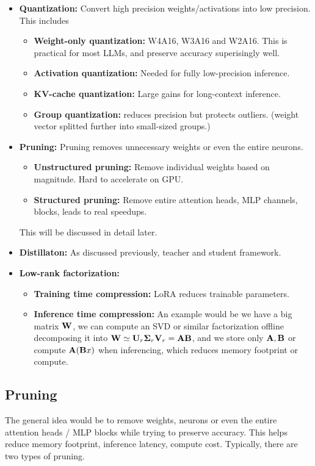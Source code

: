 \documentclass[11pt]{article}  %
\begin{document}
\begin{itemize}
  \item \textbf{Quantization:} Convert high precision weights/activations into low precision. This includes 
  \begin{itemize}
    \item \textbf{Weight-only quantization:} W4A16, W3A16 and W2A16. This is practical for most LLMs, and preserve accuracy superisingly well.
    \item \textbf{Activation quantization:} Needed for fully low-precision inference.
    \item \textbf{KV-cache quantization:} Large gains for long-context inference.
    \item \textbf{Group quantization:} reduces precision but protects outliers. (weight vector splitted further into small-sized groups.)
  \end{itemize}

  \item \textbf{Pruning:} Pruning removes unnecessary weights or even the entire neurons.
  \begin{itemize}
    \item \textbf{Unstructured pruning:} Remove individual weights based on magnitude. Hard to accelerate on GPU.
    \item \textbf{Structured pruning:} Remove entire attention heads, MLP channels, blocks, leads to real speedups.
  \end{itemize}
  This will be discussed in detail later.

  \item \textbf{Distillaton:} As discussed previously, teacher and student framework.
  
  \item \textbf{Low-rank factorization:}
  \begin{itemize}
    \item \textbf{Training time compression:} LoRA reduces trainable parameters.
    \item \textbf{Inference time compression:} An example would be we have a big matrix $\mathbf{W}$, we can compute an SVD or similar factorization offline decomposing it into $\mathbf{W} \simeq \mathbf{U}_r\mathbf{\Sigma}_r\mathbf{V}_r = \mathbf{A}\mathbf{B}$, and we store only $\mathbf{A}, \mathbf{B}$ or compute $\mathbf{A}(\mathbf{B} x)$ when inferencing, which reduces memory footprint or compute.
  \end{itemize}
\end{itemize}


\subsection{Pruning}
The general idea would be to remove weights, neurons or even the entire attention heads / MLP blocks while trying to preserve accuracy.
This helps reduce memory footprint, inference latency, compute cost.
Typically, there are two types of pruning.
\end{document}
